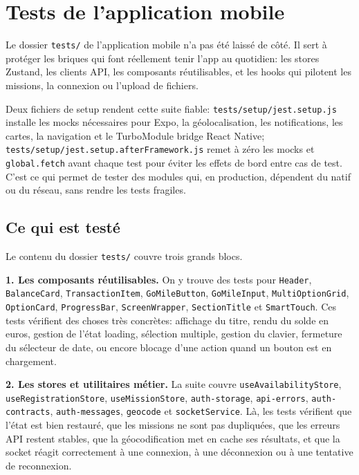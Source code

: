\section{Tests de l'application mobile}

Le dossier \texttt{tests/} de l'application mobile n'a pas été laissé de côté. Il sert à protéger les briques qui font réellement tenir l'app au quotidien: les stores Zustand, les clients API, les composants réutilisables, et les hooks qui pilotent les missions, la connexion ou l'upload de fichiers.

Deux fichiers de setup rendent cette suite fiable: \texttt{tests/setup/jest.setup.js} installe les mocks nécessaires pour Expo, la géolocalisation, les notifications, les cartes, la navigation et le TurboModule bridge React Native; \texttt{tests/setup/jest.setup.afterFramework.js} remet à zéro les mocks et \texttt{global.fetch} avant chaque test pour éviter les effets de bord entre cas de test. C'est ce qui permet de tester des modules qui, en production, dépendent du natif ou du réseau, sans rendre les tests fragiles.

\subsection{Ce qui est testé}

Le contenu du dossier \texttt{tests/} couvre trois grands blocs.

\textbf{1. Les composants réutilisables.} On y trouve des tests pour \texttt{Header}, \texttt{BalanceCard}, \texttt{TransactionItem}, \texttt{GoMileButton}, \texttt{GoMileInput}, \texttt{MultiOptionGrid}, \texttt{OptionCard}, \texttt{ProgressBar}, \texttt{ScreenWrapper}, \texttt{SectionTitle} et \texttt{SmartTouch}. Ces tests vérifient des choses très concrètes: affichage du titre, rendu du solde en euros, gestion de l'état loading, sélection multiple, gestion du clavier, fermeture du sélecteur de date, ou encore blocage d'une action quand un bouton est en chargement.

\textbf{2. Les stores et utilitaires métier.} La suite couvre \texttt{useAvailabilityStore}, \texttt{useRegistrationStore}, \texttt{useMissionStore}, \texttt{auth-storage}, \texttt{api-errors}, \texttt{auth-contracts}, \texttt{auth-messages}, \texttt{geocode} et \texttt{socketService}. Là, les tests vérifient que l'état est bien restauré, que les missions ne sont pas dupliquées, que les erreurs API restent stables, que la géocodification met en cache ses résultats, et que la socket réagit correctement à une connexion, à une déconnexion ou à une tentative de reconnexion.

